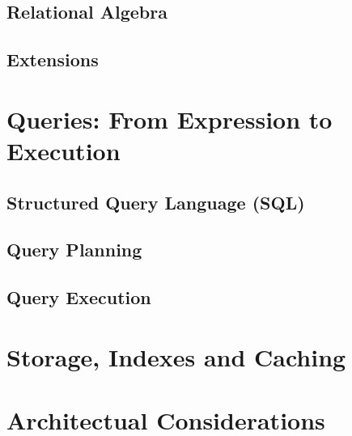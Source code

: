 \subsection{Relational Algebra}

\subsection{Extensions}

\section{Queries: From Expression to Execution}

\subsection{Structured Query Language (SQL)}

\subsection{Query Planning}

\subsection{Query Execution}

\section{Storage, Indexes and Caching}

\section{Architectual Considerations}
